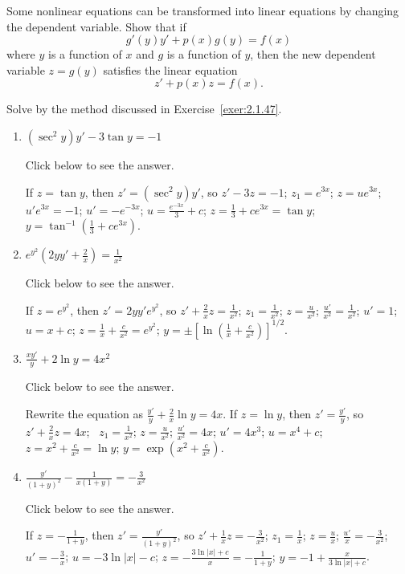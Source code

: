 \documentclass{ximera}
\begin{document}
\begin{problem}\label{exer:2.1.47}
Some nonlinear equations can be transformed into linear
equations by changing the dependent variable.  Show that if
$$
g'(y)y'+p(x)g(y)=f(x)
$$
where $y$ is a function of $x$ and $g$ is a function of $y$,
then the new dependent variable $z=g(y)$ satisfies the
linear equation
$$
z'+p(x)z=f(x).
$$
\end{problem}

\begin{problem}\label{exer:2.1.48}
Solve by the method discussed in Exercise~\ref{exer:2.1.47}.

\begin{enumerate} 
\item 
$(\sec^2y)y'- 3\tan y=-1$

Click below to see the answer.

\begin{expandable}
    If $z=\tan y$, then $z'=(\sec^2y)y'$, so $z'-3z=-1$;\;
$z_1=e^{3x}$;\;
$z=ue^{3x}$;\;
$u'e^{3x}=-1$;\;
$u'=-e^{-3x}$;\;
$u=\frac{e^{-3x}}{3}+c$;\;
$z=\frac{1}{3}+ce^{3x}=\tan y$;\;
$y=\tan^{-1}\left(\frac{1}{3}+ce^{3x}\right)$.
\end{expandable}

\item 
$e^{y^2}\left(2yy'+\frac{2}{x}\right) =\frac{1}{x^2}$

Click below to see the answer.

\begin{expandable}
    If $z=e^{y^2}$, then $z'=2yy'e^{y^2}$, so $z'+\frac{2}{
x}z=\frac{1}{ x^2}$;\;
$z_1=\frac{1}{ x^2}$;\;
$z=\frac{u}{ x^2}$;\;
$\frac{u'}{ x^2}=\frac{1}{ x^2}$;\;
$u'=1$;\;
$u=x+c$;\;
$z=\frac{1}{ x}+\frac{c}{ x^2}=e^{y^2}$;\;
$y=\pm\left[\ln\left(\frac{1}{ x}+\frac{c}{
x^2}\right)\right]^{1/2}$.
\end{expandable}

\item 
$\frac{xy'}{y} + 2\ln y=4x^2$

Click below to see the answer.

\begin{expandable}
    Rewrite the equation as $\frac{y'}{ y}+\frac{2}{ x}\ln y=4x$.
If $z=\ln y$, then $z'=\frac{y'}{ y}$, so $z'+\frac{2}{ x}z=4x$;
\
$z_1=\frac{1}{ x^2}$;\;
$z=\frac{u}{ x^2}$;\;
$\frac{u'}{ x^2}=4x$;\;
$u'=4x^3$;\;
$u=x^4+c$;\;
$z=x^2+\frac{c}{ x^2}=\ln y$;\;
$y=\exp\left(x^2+\frac{c}{ x^2}\right)$.
\end{expandable}

\item 
$\frac{y'}{(1+y)^2} -\frac{1}{x(1+y)}=-\frac{3}{x^2}$

Click below to see the answer.

\begin{expandable}
    If $z=-\frac{1}{ 1+y}$, then $z'=\frac{y'}{(1+y)^2}$, so
$z'+\frac{1}{ x}z=-\frac{3}{ x^2}$;\;
$z_1=\frac{1}{ x}$;\;
$z=\frac{u}{ x}$;\;
$\frac{u'}{ x}=-\frac{3}{ x^2}$;\;
$u'=-\frac{3}{ x}$;\;
$u=-3\ln|x|-c$;\;
$z=-\frac{3\ln|x|+c}{ x}=-\frac{1}{1+y}$;\;
$y=-1+\frac{x}{3\ln|x|+c}$.
\end{expandable}
\end{enumerate}
\end{problem}
\end{document}
